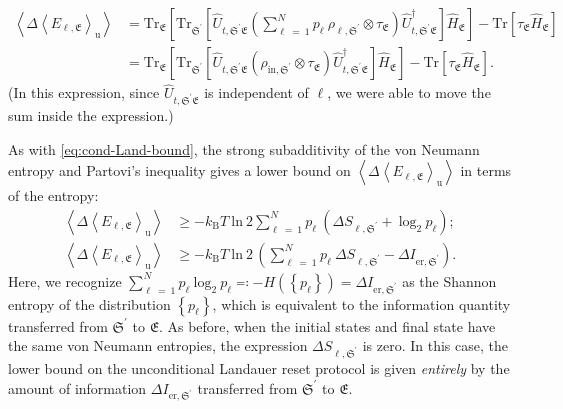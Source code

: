 \documentclass[preprints,article,accept,moreauthors,pdftex]{Definitions/mdpi}
\begin{document}
\begin{paracol}{2}
\begin{equation}
    \label{eq:uncond-Land-Delta-E}
    \begin{split}
        \left\langle \Delta \left\langle E_{\ell,\mathfrak{E}}\right\rangle_{\mathrm{u}} \right\rangle &=  \mathrm{Tr}_{\mathfrak{E}}\left[\mathrm{Tr}_{\mathfrak{S}^{\prime}} \left[ \widehat{U}_{t,\mathfrak{S^\prime E}} \left( \sum_{\ell\:=\:1}^{N} p_{\ell}\:\rho_{\ell,\mathfrak{S}^{\prime}} \otimes \tau_{\mathfrak{E}} \right) \widehat{U}_{t,\mathfrak{S^\prime E}}^{\dagger} \right] \widehat{H}_{\mathfrak{E}} \right] - \mathrm{Tr}\left[\tau_{\mathfrak{E}} \widehat{H}_{\mathfrak{E}} \right]\\[4pt]
        &=  \mathrm{Tr}_{\mathfrak{E}}\left[\mathrm{Tr}_{\mathfrak{S}^{\prime}} \left[ \widehat{U}_{t,\mathfrak{S^\prime E}} \left( \rho_{\mathrm{in},\mathfrak{S}^{\prime}} \otimes \tau_{\mathfrak{E}} \right) \widehat{U}_{t,\mathfrak{S^\prime E}}^{\dagger} \right] \widehat{H}_{\mathfrak{E}} \right] - \mathrm{Tr}\left[\tau_{\mathfrak{E}} \widehat{H}_{\mathfrak{E}} \right].
    \end{split}
\end{equation}
(In this expression, since $\widehat{U}_{t,\mathfrak{S^\prime E}}$ is independent of $\ell$, we were able to move the sum inside the expression.)

As with \eqref{eq:cond-Land-bound}, the strong subadditivity of the von Neumann entropy and Partovi's inequality gives \cite{Anderson19} a lower bound on $\left\langle \Delta \left\langle E_{\ell,\mathfrak{E}}\right\rangle_{\mathrm{u}} \right\rangle$ in terms of the entropy:
\begin{equation}
    \label{eq:uncond-Land-bound}
    \begin{split}
        \left\langle \Delta \left\langle E_{\ell,\mathfrak{E}}\right\rangle_{\mathrm{u}} \right\rangle &\geq -k_{\mathrm{B}}T\:\mathrm{ln}\:2 \sum_{\ell\:=\:1}^{N}p_{\ell}\:\left(\Delta S_{\ell,\mathfrak{S}^{\prime}} + \:\mathrm{log}_{2}\:p_\ell\right);\\[4pt]
        \left\langle \Delta \left\langle E_{\ell,\mathfrak{E}}\right\rangle_{\mathrm{u}} \right\rangle &\geq -k_{\mathrm{B}}T\:\mathrm{ln}\:2 \,\left(\sum_{\ell\:=\:1}^{N}p_{\ell}\:\Delta S_{\ell,\mathfrak{S}^{\prime}} - \Delta I_{\mathrm{er},\mathfrak{S}^{\prime}} \right).
    \end{split}
\end{equation}
Here, we recognize $\sum_{\ell\:=\:1}^{N} p_{\ell}\:\mathrm{log}_{2}\:p_{\ell} \eqqcolon -H\left(\left\{p_{\ell}\right\}\right) = \Delta I_{\mathrm{er},\mathfrak{S}^{\prime}}$ as the Shannon entropy of the distribution $\left\{p_{\ell}\right\}$, which is equivalent to the information quantity transferred from $\mathfrak{S}^{\prime}$ to $\mathfrak{E}$. As before, when the initial states and final state have the same von Neumann entropies, the expression $\Delta S_{\ell,\mathfrak{S}^{\prime}}$ is zero. In this case, the lower bound on the unconditional Landauer reset protocol is given \emph{entirely} by the amount of information $\Delta I_{\mathrm{er},\mathfrak{S}^{\prime}}$ transferred from $\mathfrak{S}^{\prime}$ to $\mathfrak{E}$.


\end{paracol}
\end{document}
